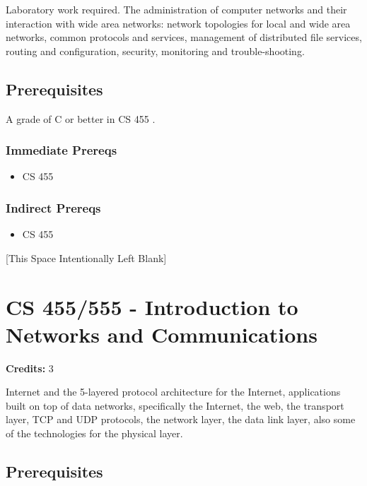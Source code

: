 \documentclass[]{article}
\providecommand{\tightlist}{%
  \setlength{\itemsep}{0pt}\setlength{\parskip}{0pt}}
\newcommand{\pagebreakhere}{
\vspace*{\fill}
\begin{center}
[This Space Intentionally Left Blank]
\end{center}
\vspace*{\fill}
\newpage
}
\begin{document}
Laboratory work required. The administration of computer networks and
their interaction with wide area networks: network topologies for local
and wide area networks, common protocols and services, management of
distributed file services, routing and configuration, security,
monitoring and trouble-shooting.

\subsection{Prerequisites}\label{prerequisites-35}

A grade of C or better in CS 455 .

\subsubsection{Immediate Prereqs}\label{immediate-prereqs-27}

\begin{itemize}
\tightlist
\item
  CS 455
\end{itemize}

\subsubsection{Indirect Prereqs}\label{indirect-prereqs-27}

\begin{itemize}
\tightlist
\item
  CS 455
\end{itemize}

\pagebreakhere
\section{CS 455/555 - Introduction to Networks and
Communications}\label{cs-455555---introduction-to-networks-and-communications}

\textbf{Credits:} 3

Internet and the 5-layered protocol architecture for the Internet,
applications built on top of data networks, specifically the Internet,
the web, the transport layer, TCP and UDP protocols, the network layer,
the data link layer, also some of the technologies for the physical
layer.

\subsection{Prerequisites}\label{prerequisites-36}
\end{document}
